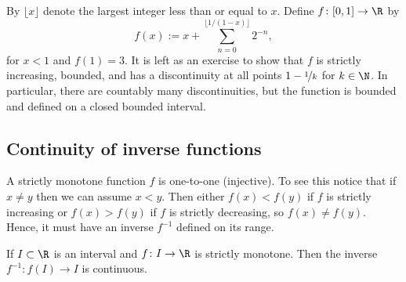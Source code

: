 \documentclass[12pt]{book}
\begin{document}
\begin{example} \label{example:countdiscont}
By $\lfloor x \rfloor$ denote the largest integer less than or equal to $x$.
Define $f \colon [0,1] \to \R$ by
\begin{equation*}
f(x) :=
x +
\sum_{n=0}^{\lfloor 1/(1-x) \rfloor}
2^{-n} ,
\end{equation*}
for $x < 1$ and $f(1) = 3$.
It is left as an exercise to show that $f$ is strictly increasing, bounded, and
has a discontinuity at all points $1-\nicefrac{1}{k}$ for $k \in \N$.
In particular,
there are countably many discontinuities, but the function is bounded and
defined on a closed bounded interval.
\end{example}


\subsection*{Continuity of inverse functions}


A strictly monotone function $f$ is one-to-one (injective).
To see this
notice that if $x \not= y$ then we can assume $x < y$.
Then either $f(x) <
f(y)$ if $f$ is strictly increasing or $f(x) > f(y)$ if $f$ is strictly
decreasing, so $f(x) \not= f(y)$.
Hence, it
must have an inverse $f^{-1}$ defined on its range.

\begin{prop} \label{prop:invcont}
If $I \subset \R$ is an interval and $f \colon I \to \R$ is strictly
monotone.
Then the inverse $f^{-1} \colon f(I) \to I$ is continuous.
\end{prop}
\end{document}
